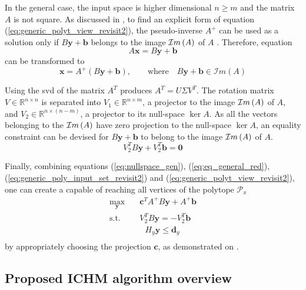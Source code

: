 In the general case, the input space is higher dimensional $n\geq m$ and the matrix $A$ is not square. As discussed in , to find an explicit form of equation (\ref{eq:generic_polyt_view_revisit2}), the pseudo-inverse $A^+$ can be used as a solution only if $B\bm{y}+\bm{b}$ belongs to the image $\mathcal{I}m\left(A\right)$ of $A$ \cite{klema_singular_1980}. Therefore, equation 
\begin{equation}
    A\bm{x} = B\bm{y} + \bm{b}
\end{equation} 
can be transformed to 
\begin{equation}
    \bm{x} = A^{+} (B \bm{y} + \bm{b}), \qquad \text{where} \quad B\bm{y} + \bm{b} \in \mathcal{I}m(A)
    \label{eq:eq_general_red}
\end{equation} 

Using the \gls{svd} \cite{klema_singular_1980} of the matrix $A^T$ produces $A^T = U\Sigma V^T$. The rotation matrix $V \in \mathbb{R}^{n\times n }$ is separated into  $V_1\in \mathbb{R}^{n\times m}$, a projector to the image $\mathcal{I}m\left(A\right)$ of $A$, and $V_2\in \mathbb{R}^{n\times(n-m)}$, a projector to its null-space $\ker{A}$. As all the vectors belonging to the $\mathcal{I}m\left(A\right)$ have zero projection to the null-space $\ker{A}$, an equality constraint can be devised for $B\bm{y}+\bm{b}$ to belong to the image $\mathcal{I}m\left(A\right)$ of $A$. 
\begin{equation}
    V_2^TB\bm{y} +V_2^T\bm{b}  = \bm{0}
    \label{eq:nullspace_gen}
\end{equation}

Finally, combining equations (\ref{eq:nullspace_gen}), (\ref{eq:eq_general_red}), (\ref{eq:generic_poly_input_set_revisit2}) and (\ref{eq:generic_polyt_view_revisit2}), one can create a  capable of reaching all vertices of the polytope $\mathcal{P}_x$
\begin{equation}
\begin{aligned}
    \max_{\bm{y}} \quad &  \bm{c}^TA^{+}B\bm{y} + A^{+}\bm{b}\\
     \textrm{s.t.} \quad &  V_2^TB\bm{y} = -V_2^T\bm{b} \\
          & ~~~  H_y \bm{y} \leq \bm{d}_y \\
\end{aligned}
\label{eq:lin_prog}
\end{equation}
by appropriately choosing the projection $\bm{c}$, as demonstrated on .



\subsection{Proposed ICHM algorithm overview}
\label{ch:method}

